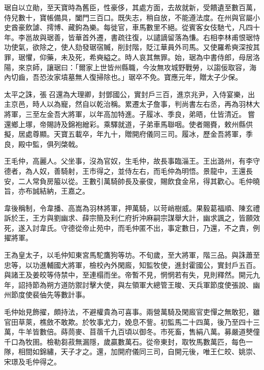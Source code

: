 \begin{pinyinscope}
 琚自以立勛，至天寶時為舊臣，性豪侈，其處方面，去故就新，受饋遺至數百萬，侍兒數十，寶帳備具，闔門三百口。既失志，稍自放，不能遵法度。在州與官屬小史酋豪飲謔、摴博、藏鉤為樂。每徙官，車馬數里不絕。從賓客女伎馳弋，凡四十年。李邕故與琚善，皆華首外遷，書疏往復，以譴謫留落為慊。右相李林甫恨琚恃功使氣，欲除之，使人劾發琚宿贓，削封階，貶江華員外司馬。又使羅希奭深按其罪，琚懼，仰藥，未及死，希奭縊之。時人哀其無罪。始，琚為中書侍郎，母居洛陽，來京師，讓琚曰：「爾家上世皆州縣職，今汝無攻城野戰勞，以謅佞取容，海內切齒，吾恐汝家墳墓無人復掃除也。」琚卒不免。寶應元年，贈太子少保。



 太平之誅，張召還為大理卿，封鄧國公，實封戶三百，進京兆尹，入侍宴樂，出主京邑，時人以為寵，然自以乾治稱。累遷太子詹事，判尚書左右丞，再為羽林大將軍，三至左金吾大將軍，以年高加特進。子履冰、季良，弟晤，仕皆清近。嘗還鄉上塚，帝賜詩及錦袍繒彩。乘驛就道，子弟車馬聯咽。使者賜賚，敕州縣供擬，居處尊顯。天寶五載卒，年九十，贈開府儀同三司。履冰，歷金吾將軍，季良，殿中監，俱列棨戟。



 王毛仲，高麗人。父坐事，沒為官奴，生毛仲，故長事臨淄王。王出潞州，有李守德者，為人奴，善騎射，王市得之，並侍左右，而毛仲為明悟。景龍中，王還長安，二人常負房箙以從。王數引萬騎帥長及豪俊，賜飲食金帛，得其歡心。毛仲曉旨，亦布誠結納，王嘉之。



 韋後稱制，令韋播、高嵩為羽林將軍，押萬騎，以苛峭樹威。果毅葛福順、陳玄禮訴於王，王方與劉幽求、薛宗簡及利仁府折沖麻嗣宗謀舉大計，幽求諷之，皆願效死，遂入討韋氏。守德從帝止苑中，而毛仲匿不出，事定數日，乃還，不之責，例擢將軍。



 王為皇太子，以毛仲知東宮馬駝鷹狗等坊。不旬歲，至大將軍，階三品。與誅蕭至忠等，以功進輔國大將軍，檢校內外閑廄，知監牧使，進封霍國公，實封戶五百。與諸王及姜皎等侍禁中，至連榻而坐。帝暫不見，惘惘若有失，見則釋然。開元九年，詔持節為朔方道防禦討擊大使，與左領軍大總管王晙、天兵軍節度使張說、幽州節度使裴伷先等數計事。



 毛仲始見飾擢，頗持法，不避權貴為可喜事。兩營萬騎及閑廄官吏憚之無敢犯，雖官田草萊，樵斂不敢欺。於牧事尤力，娩息不訾。初監馬二十四萬，後乃至四十三萬，牛羊皆數倍。蒔茼麥、苜蓿千九百頃以御冬。市死畜，售絹八萬。募嚴道僰僮千口為牧圉。檢勒芻菽無漏隱，歲贏數萬石。從帝東封，取牧馬數萬匹，每色一隊，相間如錦繡，天子才之。還，加開府儀同三司，自開元後，唯王仁皎、姚崇、宋璟及毛仲得之。




\end{pinyinscope}

